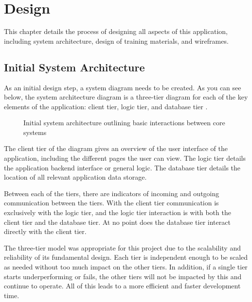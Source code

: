 \documentclass{l4proj}
\begin{document}
\chapter{Design}

This chapter details the process of designing all aspects of this application, including system architecture, design of training materials, and wireframes.

\section{Initial System Architecture}
As an initial design step, a system diagram needs to be created. As you can see below, the system architecture diagram is a three-tier diagram for each of the key elements of the application: client tier, logic tier, and database tier \citep{aarsten1996patterns}. 

\begin{figure}[H]
    \centering
    \caption{Initial system architecture outlining basic interactions between core systems}
    \label{fig:initial_arch} 
\end{figure}

The client tier of the diagram gives an overview of the user interface of the application, including the different pages the user can view. The logic tier details the application backend interface or general logic. The database tier details the location of all relevant application data storage.
\newline

Between each of the tiers, there are indicators of incoming and outgoing communication between the tiers. With the client tier communication is exclusively with the logic tier, and the logic tier interaction is with both the client tier and the database tier. At no point does the database tier interact directly with the client tier.
\newline

The three-tier model was appropriate for this project due to the scalability and reliability of its fundamental design. Each tier is independent enough to be scaled as needed without too much impact on the other tiers. In addition, if a single tier starts underperforming or fails, the other tiers will not be impacted by this and continue to operate. All of this leads to a more efficient and faster development time.
\end{document}

